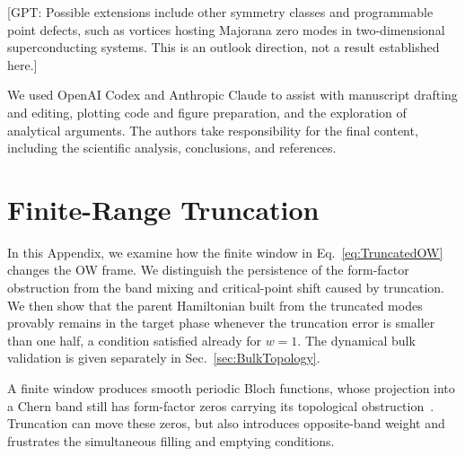 \documentclass[aps,prb,10pt,twocolumn,superscriptaddress,longbibliography,floatfix]{revtex4-2}
\newcommand{\newtext}[1]{{\color{blue}#1}}
\newcommand{\GPT}[1]{{\color{magenta}[GPT: #1]}}
\newcommand{\claudeadd}[1]{{\color{orange}#1}}
\begin{document}
\GPT{Possible extensions include other symmetry classes and programmable point defects, such as vortices hosting Majorana zero modes in two-dimensional superconducting systems. This is an outlook direction, not a result established here.}


{\color{blue}
\begin{acknowledgments}
We used OpenAI Codex and Anthropic Claude to assist with manuscript drafting and editing, plotting code and figure preparation, and the exploration of analytical arguments. The authors take responsibility for the final content, including the scientific analysis, conclusions, and references.
\end{acknowledgments}
}

\FloatBarrier
\appendix
\setcounter{figure}{0}
\renewcommand{\thefigure}{A\arabic{figure}}
\renewcommand{\theHfigure}{A\arabic{figure}}

{\color{blue}\section{Finite-Range Truncation}
\label{app:Truncation}}

{\color{blue}
In this Appendix, we examine how the finite window in Eq.~\eqref{eq:TruncatedOW} changes the OW frame. We distinguish the persistence of the form-factor obstruction from the band mixing and critical-point shift caused by truncation. \claudeadd{We then show that the parent Hamiltonian built from the truncated modes provably remains in the target phase whenever the truncation error is smaller than one half, a condition satisfied already for $w=1$.} The dynamical bulk validation is given separately in Sec.~\ref{sec:BulkTopology}.
}

\newtext{A finite window produces smooth periodic Bloch functions, whose projection into a Chern band still has form-factor zeros carrying its topological obstruction~\cite{BhuiyanPanJian2026,DubailRead2015}. Truncation can move these zeros, but also introduces opposite-band weight and frustrates the simultaneous filling and emptying conditions.}
\end{document}
